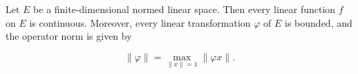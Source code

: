 Let $E$ be a finite-dimensional normed linear space. Then every linear function $f$ on $E$ is continuous. Moreover, every linear transformation $\varphi$ of $E$ is bounded, and the operator norm is given by

$$\|\varphi\| = \max_{\|x\| = 1} \|\varphi x\|.$$
